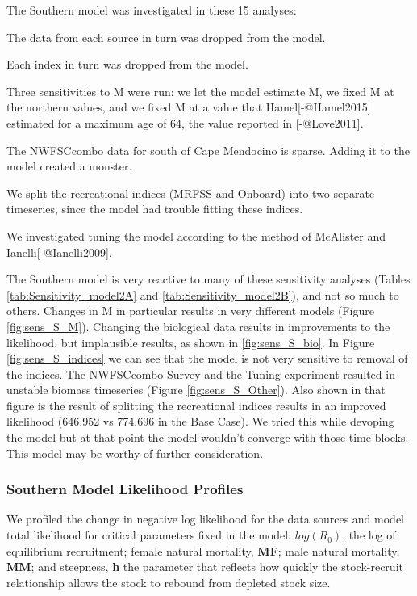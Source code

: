 \documentclass[12pt,]{article}
\begin{document}
The Southern model was investigated in these 15 analyses:

\begin{description}
\item[Drop Biological Datasets]The data from each source in turn was dropped from the model.
\item[Drop Indices]Each index in turn was dropped from the model.
\item[Changes to M]Three sensitivities to M were run:  we let the model estimate M, we fixed M at the northern values, and we fixed M at a value that Hamel[-@Hamel2015] estimated for a maximum age of 64, the value reported in [-@Love2011].
\item The NWFSCcombo data for south of Cape Mendocino is sparse.  Adding it to the model created a monster.
\item[SplitIndices] We split the recreational indices (MRFSS and Onboard) into two separate timeseries, since the model had trouble fitting these indices.
\item[Tuning] We investigated tuning the model according to the method of McAlister and Ianelli[-@Ianelli2009].  
\end{description}

The Southern model is very reactive to many of these sensitivity
analyses (Tables \ref{tab:Sensitivity_model2A} and
\ref{tab:Sensitivity_model2B}), and not so much to others. Changes in M
in particular results in very different models (Figure
\ref{fig:sens_S_M}). Changing the biological data results in
improvements to the likelihood, but implausible results, as shown in
\ref{fig:sens_S_bio}. In Figure \ref{fig:sens_S_indices} we can see that
the model is not very sensitive to removal of the indices. The
NWFSCcombo Survey and the Tuning experiment resulted in unstable biomass
timeseries (Figure \ref{fig:sens_S_Other}). Also shown in that figure is
the result of splitting the recreational indices results in an improved
likelihood (646.952 vs 774.696 in the Base Case). We tried this while
devoping the model but at that point the model wouldn't converge with
those time-blocks. This model may be worthy of further consideration.

\subsubsection{Southern Model Likelihood
Profiles}\label{southern-model-likelihood-profiles}

We profiled the change in negative log likelihood for the data sources
and model total likelihood for critical parameters fixed in the model:
\textbf{\(log(R_0)\)}, the log of equilibrium recruitment; female
natural mortality, \textbf{MF}; male natural mortality, \textbf{MM}; and
steepness, \textbf{h} the parameter that reflects how quickly the
stock-recruit relationship allows the stock to rebound from depleted
stock size.
\end{document}
